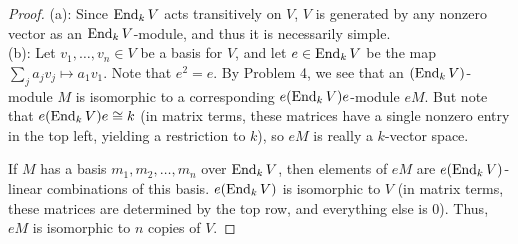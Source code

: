 \documentclass{amsart}
\begin{document}
\begin{proof}
	(a): Since $\operatorname{End}_k V$ acts transitively on $V$, $V$ is generated by any nonzero vector as an $\operatorname{End}_kV$-module, and thus it is necessarily simple.\\
	
	(b): Let $v_1,\dots,v_n\in V$ be a basis for $V$, and let $e\in \operatorname{End}_k V$ be the map $\sum_j a_jv_j \mapsto a_1v_1$. Note that $e^2=e$. By Problem 4, we see that an $(\operatorname{End}_k V)$-module $M$ is isomorphic to a corresponding $e(\operatorname{End}_k V)e$-module $eM$. But note that $e(\operatorname{End}_k V)e\cong k$ (in matrix terms, these matrices have a single nonzero entry in the top left, yielding a restriction to $k$), so $eM$ is really a $k$-vector space. 
	
	If $M$ has a basis $m_1,m_2,\dots,m_n$ over $\operatorname{End}_k V$, then elements of $eM$ are $e(\operatorname{End}_k V)$-linear combinations of this basis. $e(\operatorname{End}_k V)$ is isomorphic to $V$ (in matrix terms, these matrices are determined by the top row, and everything else is 0). Thus, $eM$ is isomorphic to $n$ copies of $V$.
	
\end{proof}
	
\end{document}

